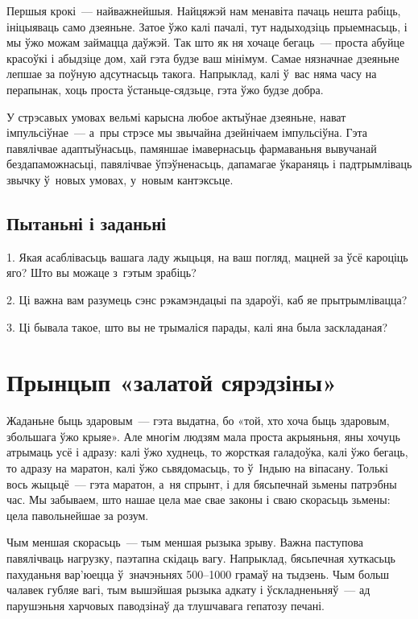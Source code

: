 
Першыя крокі~--- найважнейшыя. Найцяжэй нам менавіта пачаць нешта рабіць, ініцыяваць само дзеяньне. Затое ўжо калі пачалі, тут надыходзіць прыемнасьць, і мы ўжо можам займацца даўжэй. Так што як ня хочаце бегаць~--- проста абуйце красоўкі і абыдзіце дом, хай гэта будзе ваш мінімум. Самае нязначнае дзеяньне лепшае за поўную адсутнасьць такога. Напрыклад, калі ў~вас няма часу на перапынак, хоць проста ўстаньце-сядзьце, гэта ўжо будзе добра.

У стрэсавых умовах вельмі карысна любое актыўнае дзеяньне, нават імпульсіўнае~--- а~пры стрэсе мы звычайна дзейнічаем імпульсіўна. Гэта павялічвае адаптыўнасьць, памяншае імавернасьць фармаваньня вывучанай бездапаможнасьці, павялічвае ўпэўненасьць, дапамагае ўкараняць і падтрымліваць звычку ў~новых умовах, у~новым кантэксьце.

\subsection*{Пытаньні і заданьні}

1. Якая асаблівасьць вашага ладу жыцьця, на ваш погляд, мацней за ўсё кароціць яго? Што вы можаце з~гэтым зрабіць?

2. Ці важна вам разумець сэнс рэкамэндацыі па здароўі, каб яе прытрымлівацца?

3. Ці бывала такое, што вы не трымаліся парады, калі яна была заскладаная?


\section{Прынцып «залатой сярэдзіны»}

Жаданьне быць здаровым~--- гэта выдатна, бо «той, хто хоча быць здаровым, збольшага ўжо крыяе». Але многім людзям мала проста акрыяньня, яны хочуць атрымаць усё і адразу: калі ўжо худнець, то жорсткая галадоўка, калі ўжо бегаць, то адразу на маратон, калі ўжо сьвядомасьць, то ў~Індыю на віпасану. Толькі вось жыцьцё~--- гэта маратон, а~ня спрынт, і для бясьпечнай зьмены патрэбны час. Мы забываем, што нашае цела мае свае законы і сваю скорасьць зьмены: цела павольнейшае за розум.

Чым меншая скорасьць~--- тым меншая рызыка зрыву. Важна паступова павялічваць нагрузку, паэтапна скідаць вагу. Напрыклад, бясьпечная хуткасьць пахуданьня вар'юецца ў~значэньнях 500--1000 грамаў на тыдзень. Чым больш чалавек губляе вагі, тым вышэйшая рызыка адкату і ўскладненьняў~--- ад парушэньня харчовых паводзінаў да тлушчавага гепатозу печані.

